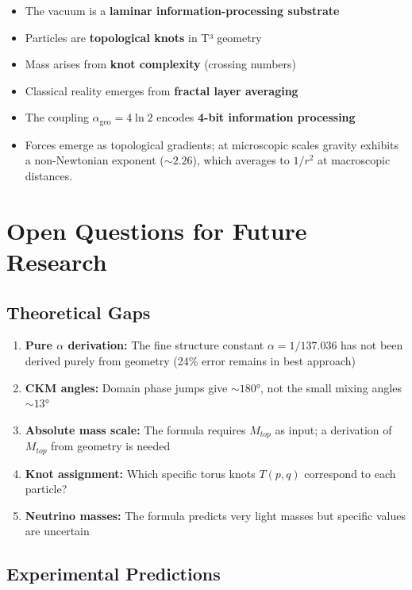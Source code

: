 \documentclass[11pt,a4paper]{book}
\theoremstyle{remark}
\newcommand{\alphageo}{\alpha_{\text{geo}}}
\begin{document}
\begin{itemize}
    \item The vacuum is a \textbf{laminar information-processing substrate}
    \item Particles are \textbf{topological knots} in T³ geometry
    \item Mass arises from \textbf{knot complexity} (crossing numbers)
    \item Classical reality emerges from \textbf{fractal layer averaging}
    \item The coupling $\alphageo = 4\ln 2$ encodes \textbf{4-bit information processing}
    \item Forces emerge as topological gradients; at microscopic scales gravity exhibits a non-Newtonian exponent ($\sim 2.26$), which averages to $1/r^2$ at macroscopic distances.
\end{itemize}

\section{Open Questions for Future Research}

\subsection{Theoretical Gaps}

\begin{enumerate}
    \item \textbf{Pure $\alpha$ derivation:} The fine structure constant $\alpha = 1/137.036$ has not been derived purely from geometry (24\% error remains in best approach)
    
    \item \textbf{CKM angles:} Domain phase jumps give $\sim 180°$, not the small mixing angles $\sim 13°$
    
    \item \textbf{Absolute mass scale:} The formula requires $M_{top}$ as input; a derivation of $M_{top}$ from geometry is needed
    
    \item \textbf{Knot assignment:} Which specific torus knots $T(p,q)$ correspond to each particle?
    
    \item \textbf{Neutrino masses:} The formula predicts very light masses but specific values are uncertain
\end{enumerate}

\subsection{Experimental Predictions}
\end{document}

